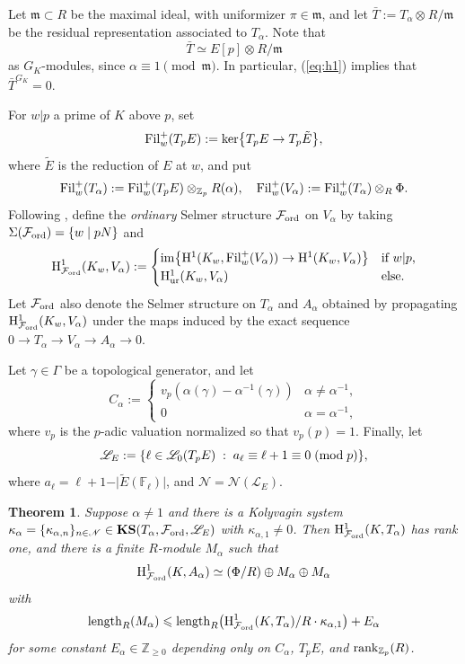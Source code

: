 \documentclass[10pt]{amsart}
\numberwithin{equation}{section}
\newtheorem{theorem}{Theorem}
\theoremstyle{definition}
\theoremstyle{remark}
\newcommand{\Z}{\mathbb{Z}}
\newcommand{\cL}{\mathscr{L}}
\newcommand{\cN}{\mathscr{N}}
\newcommand{\Fcal}{\mathcal{F}}
\newcommand{\bZ}{\mathbb{Z}}
\newcommand{\rH}{\mathrm{H}}
\newcommand{\fm}{\mathfrak{m}}
\DeclareMathOperator{\ord}{ord}
\begin{document}
Let $\fm\subset R$ be the maximal ideal, 
with uniformizer $\pi\in\fm$, 
and let $\bar{T}:=T_\alpha\otimes_{} R/\fm$ be the residual representation associated to $T_\alpha$. Note that
\begin{equation}\label{eq:modp}
\bar{T}\simeq E[p]\otimes_{}R/\fm
\end{equation}
as $G_K$-modules, since $\alpha\equiv 1\pmod{\fm}$. In particular, (\ref{eq:h1}) implies that $\bar{T}^{G_K}=0$. 

For $w\vert p$ a prime of $K$ above $p$,  set 
\[
{\rm Fil}_w^+(T_pE):={\rm ker}\bigl\{T_pE\rightarrow T_p\tilde{E}\bigr\},
\]
where $\tilde{E}$ is the reduction of $E$ at $w$, and put
\[
{\rm Fil}_w^+(T_\alpha):={\rm Fil}_w^+(T_pE)\otimes_{\bZ_p}R(\alpha),\quad{\rm Fil}_w^+(V_\alpha):={\rm Fil}_w^+(T_\alpha)\otimes_{R}\Phi.
\]
Following \cite{coates-greenberg},  define the \emph{ordinary} Selmer structure $\Fcal_{\rm ord}$ on $V_\alpha$ by
taking $\Sigma(\Fcal_{\rm \ord}) = \{w\mid pN\}$ and  
\[
\rH^1_{\Fcal_{\rm ord}}(K_w,V_\alpha):=
\begin{cases}
{\rm im}\bigl\{\rH^1(K_w,{\rm Fil}_w^+(V_\alpha))\rightarrow\rH^1(K_w,V_\alpha)\bigr\} & \textrm{if $w\vert p$,}\\
\rH^1_{\rm ur}(K_w,V_\alpha)& \textrm{else.}
\end{cases}
\]
Let $\Fcal_{\rm ord}$ also denote the Selmer structure on $T_\alpha$ and $A_\alpha$ obtained by propagating $\rH^1_{\Fcal_{\rm ord}}(K_w,V_\alpha)$ under the maps induced by the exact sequence 
$0\rightarrow T_\alpha\rightarrow V_\alpha\rightarrow A_\alpha\rightarrow 0$.

Let $\gamma\in\Gamma$ be a topological generator, and let 
\begin{equation}\label{eq:erralpha}
C_\alpha:=
\begin{cases}
v_p(\alpha(\gamma)-\alpha^{-1}(\gamma)) & \alpha\neq \alpha^{-1}, \\
0 & \alpha = \alpha^{-1},
\end{cases}
\end{equation}
where $v_p$ is the $p$-adic valuation normalized so that $v_p(p)=1$. Finally, let 
\[
\cL_E:=\{\ell\in\cL_0(T_pE)\;:\;a_\ell\equiv\ell+1\equiv 0\;({\rm mod}\;p)\},
\]
where $a_\ell=\ell+1-\vert\tilde{E}(\mathbb{F}_\ell)\vert$, and $\cN=\cN(\cL_E)$. 

\begin{theorem}\label{thm:Zp-twisted}
Suppose $\alpha\neq 1$ and there is a Kolyvagin system $\kappa_\alpha=\{\kappa_{\alpha,n}\}_{n\in\cN}\in\mathbf{KS}(T_\alpha,\Fcal_{\rm ord},\cL_E)$ with $\kappa_{\alpha,1}\neq 0$. Then $\rH^1_{\Fcal_{\rm ord}}(K,T_\alpha)$ has rank one, and there is a finite $R$-module $M_\alpha$ such that
\[
{\rm H}^1_{\Fcal_{\rm ord}}(K,A_\alpha)\simeq(\Phi/R)\oplus M_\alpha\oplus M_\alpha
\]
with 
\[
{\rm length}_R(M_\alpha)\leqslant {\rm length}_R\bigl({\rm H}^1_{\Fcal_{\rm ord}}(K,T_\alpha)/R\cdot\kappa_{\alpha,1}\bigr)+E_\alpha
\]
for some constant $E_\alpha\in\Z_{\geqslant 0}$ depending only on  $C_{\alpha}$, $T_pE$, and ${\rm rank}_{\bZ_p}(R)$.
\end{theorem}
\end{document}
